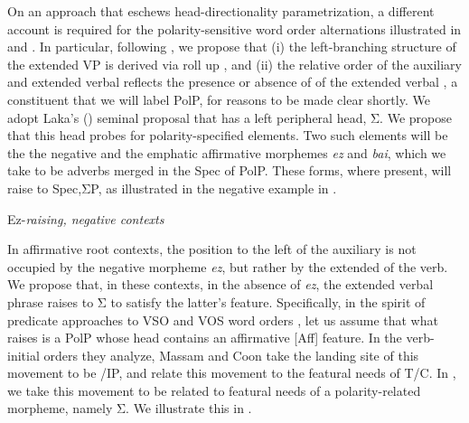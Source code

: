 \documentclass[output=paper]{langscibook}
\begin{document}
On an approach that eschews head-directionality parametrization, a different account is required for the polarity-sensitive word order alternations illustrated in  and \protect{}.  In particular, following \citet{haddican2004a,haddican2008}, we propose that  (i) the left-branch\-ing structure of the extended VP is derived via roll up \citep{Kayne1994}, and (ii) the relative order of the auxiliary and extended verbal  reflects the presence or absence of  of the extended verbal , a constituent that we will label PolP, for reasons to be made clear shortly.  We adopt Laka's (\citeyear{Laka1990}) seminal proposal that  has a left peripheral  head, Σ.  We propose that this head probes for polarity-specified elements.  Two such elements will be the the negative and the emphatic affirmative morphemes \textit{ez} and \textit{bai}, which we take to be   adverbs merged in the Spec of  PolP. These forms, where present, will raise to Spec,ΣP, as illustrated in the negative example in .\largerpage[1]
	
\ea \label{ex:haddican:34} Ez-\textit{raising, negative contexts} \protect\label{tree-5} \\  \samepage
{}
\z\newpage

In affirmative root contexts, the position to the left of the auxiliary is not occupied by the negative morpheme \textit{ez}, but rather by the extended  of the verb.  We propose that, in these contexts, in the absence of \textit{ez}, the extended verbal phrase raises to Σ to satisfy the latter's  feature.  Specifically, in the spirit of predicate  approaches to VSO and VOS word orders  \citep{massam2000, massam2001, massam2010, coon2010, coon2012}, let us assume that what raises is a PolP whose head contains an affirmative  [Aff] feature.  In the verb-initial orders they analyze, Massam and Coon take the landing site of this movement to be \slash IP, and relate this movement to the featural needs of T/C.  In , we take this movement to be related to featural needs of a polarity-related morpheme, namely  Σ. We illustrate this in .\protect\footnotemark \protect{}
 	 
\end{document}
